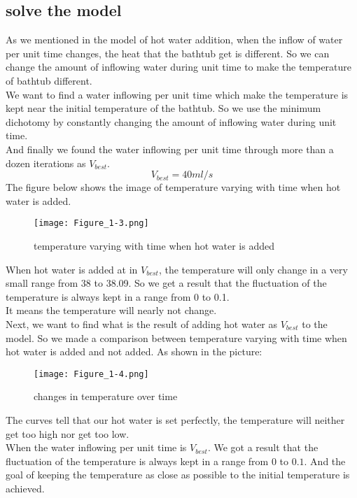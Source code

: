 \documentclass{mcmthesis}
\begin{document}
\subsection{solve the model}%
\indent As we mentioned in the model of hot water addition, when the inflow of water per unit time changes, the heat that the bathtub get is different. So we can change the amount of inflowing water during unit time to make the temperature of bathtub different.\\ 
\indent We want to find a water inflowing per unit time which make the temperature is kept near the initial temperature of the bathtub. 
So we use the minimum dichotomy by constantly changing the amount of inflowing water during unit time. \\			
\indent And finally we found the water inflowing per unit time through more than a dozen iterations as $V_{best}$.\\
\begin{equation}
	V_{best}=40ml/s
\end{equation}
\indent The figure below shows the image of temperature varying with time when hot water is added.
\begin{figure}[H]	%
\centerline{\texttt{[image: Figure\_1-3.png]}}
\caption{temperature varying with time when hot water is added}
\label{oval}	
\end{figure}
\indent When hot water is added at in $V_{best}$, the temperature will only change in a very small range from 38 to 38.09. So we get a result that the fluctuation of the temperature is always kept in a range from 0 to 0.1. \\
\indent It means the temperature will nearly not change.\\
\indent Next, we want to find what is the result of adding hot water as $V_{best}$ to the model. So we made a comparison between temperature varying with time when hot water is added and not added. As shown in the picture:
\begin{figure}[H]	%
\centerline{\texttt{[image: Figure\_1-4.png]}}
\caption{changes in temperature over time}
\label{oval}	
\end{figure}
\indent The curves tell that our hot water is set perfectly, the temperature will neither get too high nor get too low. \\
\indent When the water inflowing per unit time is $V_{best}$. We got a result that the fluctuation of the temperature is always kept in a range from $0$ to $0.1$. And the goal of keeping the temperature as close as possible to the initial temperature is achieved.
\end{document}
